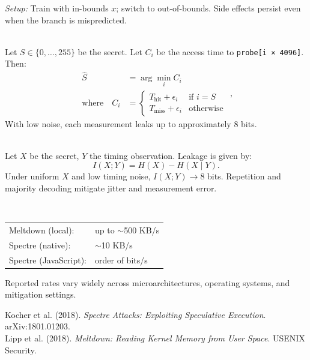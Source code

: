 \begin{technical}
\textit{Setup:} Train with in-bounds \( x \); switch to out-of-bounds. Side effects persist even when the branch is mispredicted.

\vspace{0.4em}
\\[0.5em]
Let \( S \in \{0,\dots,255\} \) be the secret. Let \( C_i \) be the access time to \texttt{probe[i × 4096]}. Then:
\[
\begin{aligned}
\hat{S} &= \arg\min_i C_i \\
\text{where} \quad
C_i &= 
\begin{cases}
T_\text{hit} + \epsilon_i & \text{if } i = S \\
T_\text{miss} + \epsilon_i & \text{otherwise}
\end{cases}
\end{aligned},
\]
With low noise, each measurement leaks up to approximately 8 bits.

\vspace{0.4em}
\\[0.5em]
Let \( X \) be the secret, \( Y \) the timing observation. Leakage is given by:
\[
I(X; Y) = H(X) - H(X \mid Y).
\]
Under uniform \( X \) and low timing noise, \( I(X; Y) \to 8 \) bits. Repetition and majority decoding mitigate jitter and measurement error.

\vspace{0.4em}
\\[0.5em]
\begin{tabular}{@{}ll@{}}
Meltdown (local):     & up to $\sim$500 KB/s \\
Spectre (native):     & $\sim$10 KB/s \\
Spectre (JavaScript): & order of bits/s \\
\end{tabular}

Reported rates vary widely across microarchitectures, operating systems, and mitigation settings.

\techref
{\footnotesize
Kocher et al. (2018). \textit{Spectre Attacks: Exploiting Speculative Execution}. arXiv:1801.01203.\\
Lipp et al. (2018). \textit{Meltdown: Reading Kernel Memory from User Space}. USENIX Security.\\
}
\end{technical}
